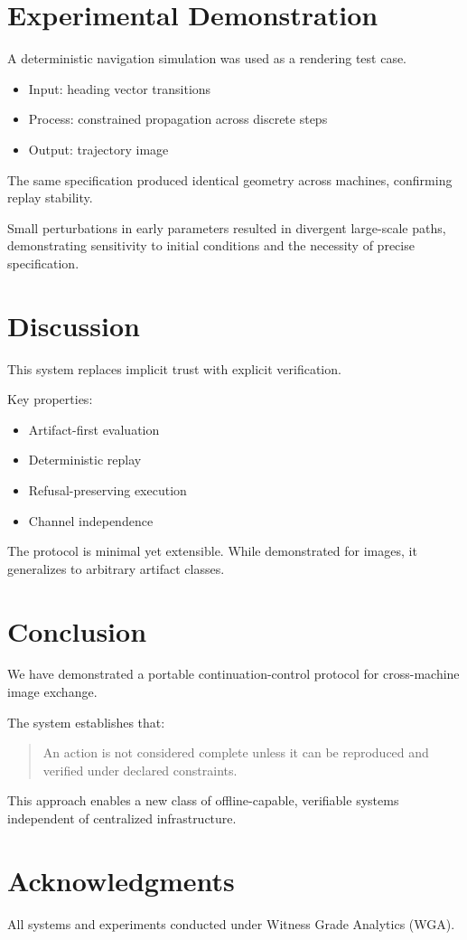 \documentclass[11pt]{article}
\begin{document}
\section{Experimental Demonstration}

A deterministic navigation simulation was used as a rendering test case.

\begin{itemize}
\item Input: heading vector transitions
\item Process: constrained propagation across discrete steps
\item Output: trajectory image
\end{itemize}

The same specification produced identical geometry across machines, confirming replay stability.

Small perturbations in early parameters resulted in divergent large-scale paths, demonstrating sensitivity to initial conditions and the necessity of precise specification.

\section{Discussion}

This system replaces implicit trust with explicit verification.

Key properties:

\begin{itemize}
\item Artifact-first evaluation
\item Deterministic replay
\item Refusal-preserving execution
\item Channel independence
\end{itemize}

The protocol is minimal yet extensible. While demonstrated for images, it generalizes to arbitrary artifact classes.

\section{Conclusion}

We have demonstrated a portable continuation-control protocol for cross-machine image exchange.

The system establishes that:

\begin{quote}
An action is not considered complete unless it can be reproduced and verified under declared constraints.
\end{quote}

This approach enables a new class of offline-capable, verifiable systems independent of centralized infrastructure.

\section*{Acknowledgments}

All systems and experiments conducted under Witness Grade Analytics (WGA).
\end{document}
